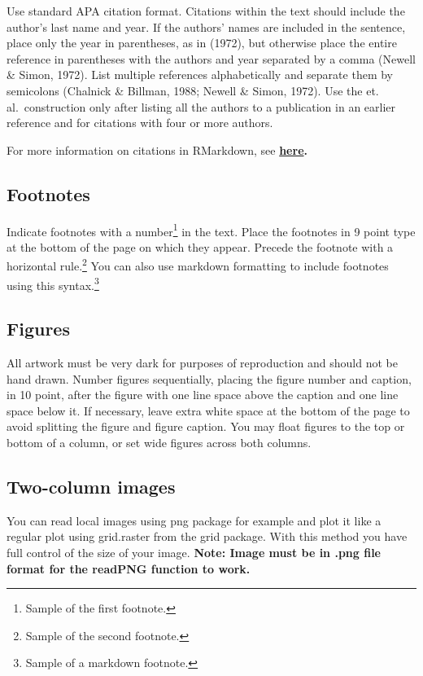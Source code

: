 \documentclass[10pt, letterpaper]{article}
\begin{document}
Use standard APA citation format. Citations within the text should
include the author's last name and year. If the authors' names are
included in the sentence, place only the year in parentheses, as in
(1972), but otherwise place the entire reference in parentheses with the
authors and year separated by a comma (Newell \& Simon, 1972). List
multiple references alphabetically and separate them by semicolons
(Chalnick \& Billman, 1988; Newell \& Simon, 1972). Use the et.
al.~construction only after listing all the authors to a publication in
an earlier reference and for citations with four or more authors.

For more information on citations in RMarkdown, see
\textbf{\href{http://rmarkdown.rstudio.com/authoring_bibliographies_and_citations.html\#citations}{here}.}

\hypertarget{footnotes}{%
\subsection{Footnotes}\label{footnotes}}

Indicate footnotes with a number\footnote{Sample of the first
footnote.} in the text. Place the footnotes in 9 point type at the
bottom of the page on which they appear. Precede the footnote with a
horizontal rule.\footnote{Sample of the second footnote.} You can also
use markdown formatting to include footnotes using this
syntax.\footnote{Sample of a markdown footnote.}

\hypertarget{figures}{%
\subsection{Figures}\label{figures}}

All artwork must be very dark for purposes of reproduction and should
not be hand drawn. Number figures sequentially, placing the figure
number and caption, in 10 point, after the figure with one line space
above the caption and one line space below it. If necessary, leave extra
white space at the bottom of the page to avoid splitting the figure and
figure caption. You may float figures to the top or bottom of a column,
or set wide figures across both columns.

\hypertarget{two-column-images}{%
\subsection{Two-column images}\label{two-column-images}}

You can read local images using png package for example and plot it like
a regular plot using grid.raster from the grid package. With this method
you have full control of the size of your image. \textbf{Note: Image
must be in .png file format for the readPNG function to work.}
\end{document}

